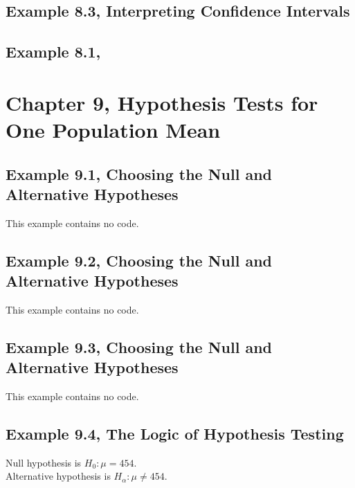 \documentclass{article}\usepackage[]{graphicx}\usepackage[]{color}
\begin{document}
\subsection{Example 8.3, Interpreting Confidence Intervals}

\subsection{Example 8.1, }


\section[Chapter 9]{Chapter 9, Hypothesis Tests for One Population Mean}

\subsection{Example 9.1, Choosing the Null and Alternative Hypotheses}This example contains no code.
\subsection{Example 9.2, Choosing the Null and Alternative Hypotheses}This example contains no code.
\subsection{Example 9.3, Choosing the Null and Alternative Hypotheses}This example contains no code.
\subsection{Example 9.4, The Logic of Hypothesis Testing}

Null hypothesis is $H_0: \mu = 454$. \\
Alternative hypothesis is $H_\alpha: \mu \not= 454$.
\end{document}
